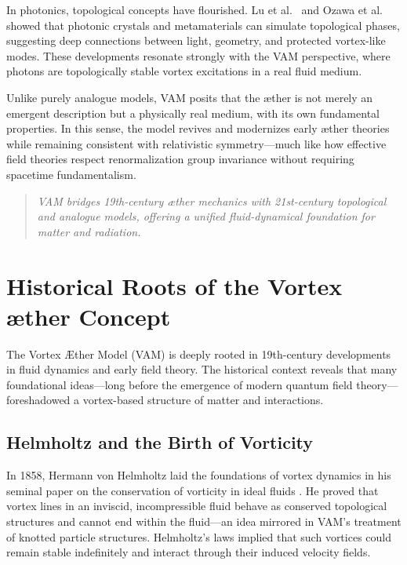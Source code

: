     In photonics, topological concepts have flourished. Lu et al.~\cite{lu2014} and Ozawa et al.~\cite{ozawa2019} showed that photonic crystals and metamaterials can simulate topological phases, suggesting deep connections between light, geometry, and protected vortex-like modes. These developments resonate strongly with the VAM perspective, where photons are topologically stable vortex excitations in a real fluid medium.

    Unlike purely analogue models, VAM posits that the æther is not merely an emergent description but a physically real medium, with its own fundamental properties. In this sense, the model revives and modernizes early æther theories while remaining consistent with relativistic symmetry—much like how effective field theories respect renormalization group invariance without requiring spacetime fundamentalism.

    \begin{quote}
        \emph{VAM bridges 19th-century æther mechanics with 21st-century topological and analogue models, offering a unified fluid-dynamical foundation for matter and radiation.}
    \end{quote}


\section{Historical Roots of the Vortex \ae ther Concept}


    The Vortex \AE ther Model (VAM) is deeply rooted in 19th-century developments in fluid dynamics and early field theory. The historical context reveals that many foundational ideas—long before the emergence of modern quantum field theory—foreshadowed a vortex-based structure of matter and interactions.


    \subsection{Helmholtz and the Birth of Vorticity}


    In 1858, Hermann von Helmholtz laid the foundations of vortex dynamics in his seminal paper on the conservation of vorticity in ideal fluids \cite{helmholtz1858}. He proved that vortex lines in an inviscid, incompressible fluid behave as conserved topological structures and cannot end within the fluid—an idea mirrored in VAM's treatment of knotted particle structures. Helmholtz’s laws implied that such vortices could remain stable indefinitely and interact through their induced velocity fields.


